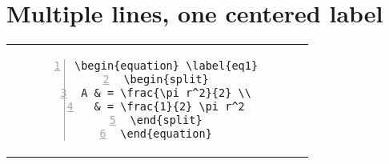 \section{Multiple lines, one centered label}
\begin{tabular}{l | c}
\begin{minipage}[m]{0.4\textwidth}
\enum{ \begin{equation} \label{eq1}
\begin{split}
A & = \frac{\pi r^2}{2} \\
 & = \frac{1}{2} \pi r^2
\end{split}
\end{equation} }{1.6}
\end{minipage}
& \begin{minipage}[m]{0.5\textwidth}
\renewcommand\textminus{\mbox{-}}%
\begin{lstlisting}[numberstyle=\zebra{black!5}{blue!15},numbers=left,basicstyle=\footnotesize] 
\begin{equation} \label{eq1}
\begin{split}
A & = \frac{\pi r^2}{2} \\
 & = \frac{1}{2} \pi r^2
\end{split}
\end{equation}
\end{lstlisting}
\end{minipage}
\end{tabular}

